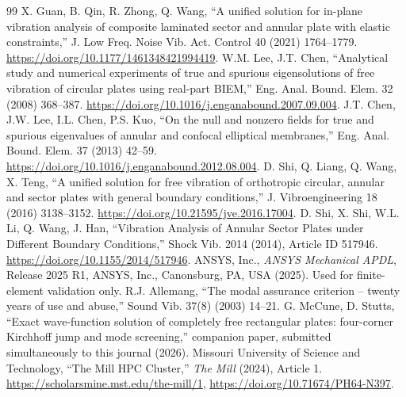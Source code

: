 \documentclass[11pt]{article}
\begin{document}
\begin{thebibliography}{99}
 X. Guan, B. Qin, R. Zhong, Q. Wang, ``A unified solution for
in-plane vibration analysis of composite laminated sector and annular
plate with elastic constraints,'' J. Low Freq. Noise Vib. Act. Control 40
(2021) 1764--1779. \url{https://doi.org/10.1177/1461348421994419}.
 W.M. Lee, J.T. Chen, ``Analytical study and numerical
experiments of true and spurious eigensolutions of free vibration of
circular plates using real-part BIEM,'' Eng. Anal. Bound. Elem. 32 (2008)
368--387. \url{https://doi.org/10.1016/j.enganabound.2007.09.004}.
 J.T. Chen, J.W. Lee, I.L. Chen, P.S. Kuo, ``On the null
and nonzero fields for true and spurious eigenvalues of annular and
confocal elliptical membranes,'' Eng. Anal. Bound. Elem. 37 (2013) 42--59.
\url{https://doi.org/10.1016/j.enganabound.2012.08.004}.
 D. Shi, Q. Liang, Q. Wang, X. Teng, ``A unified solution
for free vibration of orthotropic circular, annular and sector plates
with general boundary conditions,'' J. Vibroengineering 18 (2016)
3138--3152. \url{https://doi.org/10.21595/jve.2016.17004}.
 D. Shi, X. Shi, W.L. Li, Q. Wang, J. Han,
``Vibration Analysis of Annular Sector Plates under Different Boundary
Conditions,'' Shock Vib. 2014 (2014), Article ID 517946.
\url{https://doi.org/10.1155/2014/517946}.
 ANSYS, Inc., \emph{ANSYS Mechanical APDL}, Release 2025 R1,
ANSYS, Inc., Canonsburg, PA, USA (2025). Used for finite-element validation
only.
 R.J. Allemang, ``The modal assurance criterion --
twenty years of use and abuse,'' Sound Vib. 37(8) (2003) 14--21.
 G. McCune, D. Stutts, ``Exact wave-function
solution of completely free rectangular plates: four-corner Kirchhoff
jump and mode screening,'' companion paper, submitted simultaneously
to this journal (2026).
 Missouri University of Science and Technology, ``The
Mill HPC Cluster,'' \emph{The Mill} (2024), Article 1.
\url{https://scholarsmine.mst.edu/the-mill/1},
\url{https://doi.org/10.71674/PH64-N397}.
\end{thebibliography}
\end{document}
